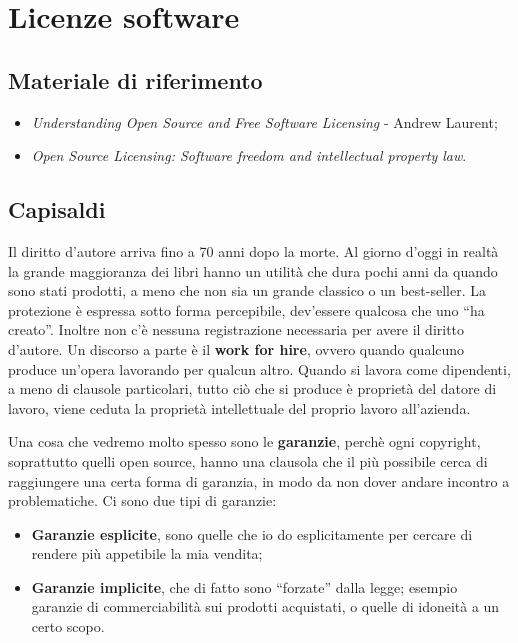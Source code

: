 \section{Licenze software}

\subsection*{Materiale di riferimento}

\begin{itemize}

\item \textit{Understanding Open Source and Free Software Licensing} - Andrew Laurent;
\item \textit{Open Source Licensing: Software freedom and intellectual property law}.

\end{itemize}

\subsection{Capisaldi}

Il diritto d'autore arriva fino a 70 anni dopo la morte. Al giorno d'oggi in realtà la grande maggioranza dei libri hanno un utilità che dura pochi anni da quando sono stati prodotti, a meno che non sia un grande classico o un best-seller. La protezione è espressa sotto forma percepibile, dev'essere qualcosa che uno ``ha creato''. Inoltre non c'è nessuna registrazione necessaria per avere il diritto d'autore. Un discorso a parte è il \textbf{work for hire}, ovvero quando qualcuno produce un'opera lavorando per qualcun altro. Quando si lavora come dipendenti, a meno di clausole particolari, tutto ciò che si produce è proprietà del datore di lavoro, viene ceduta la proprietà intellettuale del proprio lavoro all'azienda.  

Una cosa che vedremo molto spesso sono le \textbf{garanzie}, perchè ogni copyright, soprattutto quelli open source, hanno una clausola che il più possibile cerca di raggiungere una certa forma di garanzia, in modo da non dover andare incontro a problematiche. Ci sono due tipi di garanzie:

\begin{itemize}

\item \textbf{Garanzie esplicite}, sono quelle che io do esplicitamente per cercare di rendere più appetibile la mia vendita; 

\item \textbf{Garanzie implicite}, che di fatto sono ``forzate'' dalla legge; esempio garanzie di commerciabilità sui prodotti acquistati, o quelle di idoneità a un certo scopo.

\end{itemize}

